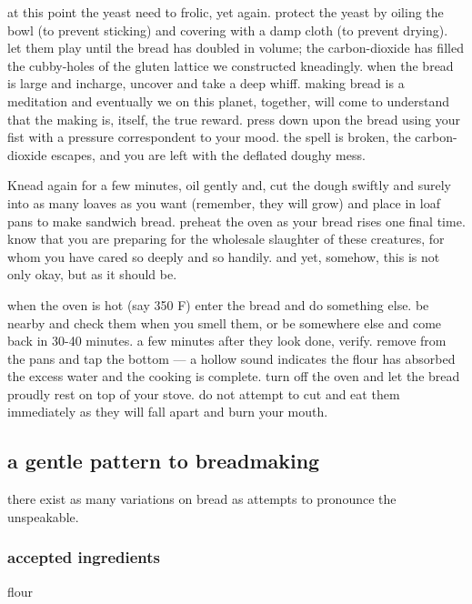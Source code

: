 at this point the yeast need to frolic, yet again. protect the yeast
by oiling the bowl (to prevent sticking) and covering with a damp
cloth (to prevent drying). let them play until the bread has doubled
in volume; the carbon-dioxide has filled the cubby-holes of the gluten
lattice we constructed kneadingly. when the bread is large and
incharge, uncover and take a deep whiff. making bread is a meditation
and eventually we on this planet, together, will come to understand
that the making is, itself, the true reward. press down upon the bread
using your fist with a pressure correspondent to your mood. the spell
is broken, the carbon-dioxide escapes, and you are left with the
deflated doughy mess.

Knead again for a few minutes, oil gently and, cut the dough swiftly
and surely into as many loaves as you want (remember, they will grow)
and place in loaf pans to make sandwich bread. preheat the oven as
your bread rises one final time. know that you are preparing for the
wholesale slaughter of these creatures, for whom you have cared so
deeply and so handily. and yet, somehow, this is not only okay, but as
it should be.

when the oven is hot (say 350 F) enter the bread and do something
else. be nearby and check them when you smell them, or be somewhere
else and come back in 30-40 minutes. a few minutes after they look
done, verify. remove from the pans and tap the bottom --- a hollow
sound indicates the flour has absorbed the excess water and the
cooking is complete. turn off the oven and let the bread proudly rest
on top of your stove. do not attempt to cut and eat them immediately
as they will fall apart and burn your mouth.

\subsection{a gentle pattern to breadmaking}
	
there exist as many variations on bread as attempts to pronounce the
unspeakable.

\subsubsection{accepted ingredients}

\begin{ingredients}\item flour\end{ingredients}

